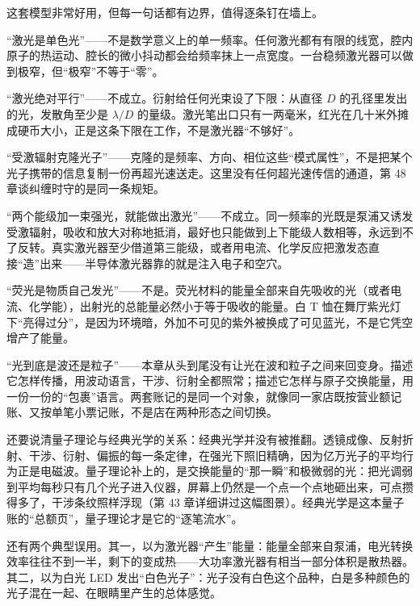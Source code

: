 \begin{mainline}
这套模型非常好用，但每一句话都有边界，值得逐条钉在墙上。

“激光是单色光”——不是数学意义上的单一频率。任何激光都有有限的线宽，腔内原子的热运动、腔长的微小抖动都会给频率抹上一点宽度。一台稳频激光器可以做到极窄，但“极窄”不等于“零”。

“激光绝对平行”——不成立。衍射给任何光束设了下限：从直径 \(D\) 的孔径里发出的光，发散角至少是 \(\lambda/D\) 的量级。激光笔出口只有一两毫米，红光在几十米外摊成硬币大小，正是这条下限在工作，不是激光器“不够好”。

“受激辐射克隆光子”——克隆的是频率、方向、相位这些“模式属性”，不是把某个光子携带的信息复制一份再超光速送走。这里没有任何超光速传信的通道，第 48 章谈纠缠时守的是同一条规矩。

“两个能级加一束强光，就能做出激光”——不成立。同一频率的光既是泵浦又诱发受激辐射，吸收和放大对称地抵消，最好也只能做到上下能级人数相等，永远到不了反转。真实激光器至少借道第三能级，或者用电流、化学反应把激发态直接“造”出来——半导体激光器靠的就是注入电子和空穴。

“荧光是物质自己发光”——不是。荧光材料的能量全部来自先吸收的光（或者电流、化学能），出射光的总能量必然小于等于吸收的能量。白 T 恤在舞厅紫光灯下“亮得过分”，是因为环境暗，外加不可见的紫外被换成了可见蓝光，不是它凭空增产了能量。

“光到底是波还是粒子”——本章从头到尾没有让光在波和粒子之间来回变身。描述它怎样传播，用波动语言，干涉、衍射全都照常；描述它怎样与原子交换能量，用一份一份的“包裹”语言。两套账记的是同一个对象，就像同一家店既按营业额记账、又按单笔小票记账，不是店在两种形态之间切换。

还要说清量子理论与经典光学的关系：经典光学并没有被推翻。透镜成像、反射折射、干涉、衍射、偏振的每一条定律，在强光下照旧精确，因为亿万光子的平均行为正是电磁波。量子理论补上的，是交换能量的“那一瞬”和极微弱的光：把光调弱到平均每秒只有几个光子进入仪器，屏幕上仍然是一个点一个点地砸出来，可点攒得多了，干涉条纹照样浮现（第 43 章详细讲过这幅图景）。经典光学是这本量子账的“总额页”，量子理论才是它的“逐笔流水”。

还有两个典型误用。其一，以为激光器“产生”能量：能量全部来自泵浦，电光转换效率往往不到一半，剩下的变成热——大功率激光器有相当一部分体积是散热器。其二，以为白光 LED 发出“白色光子”：光子没有白色这个品种，白是多种颜色的光子混在一起、在眼睛里产生的总体感觉。
\end{mainline}

